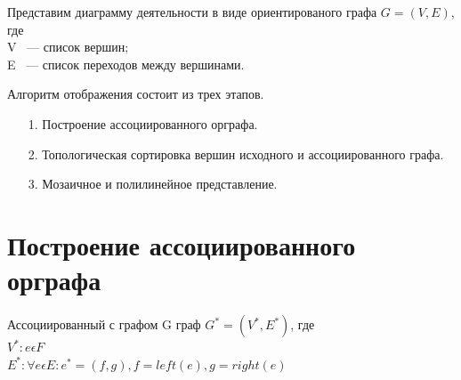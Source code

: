 \documentclass[12pt]{article}
\begin{document}
Представим диаграмму деятельности в виде ориентированого графа $ G = (V, E) $, где \\ V ~--- список вершин; \\ E ~--- список переходов между вершинами.

Алгоритм отображения состоит из трех этапов.
\begin{enumerate}
\item[1.] Построение ассоциированного орграфа.
\item[2.] Топологическая сортировка вершин исходного и ассоциированного графа.
\item[3.] Мозаичное и полилинейное представление.
\end{enumerate}

\section{Построение ассоциированного орграфа}

Ассоциированный с графом G граф $ G^{*} = (V^{*}, E^{*}) $, где \\
$ V^{*} : e \epsilon F $ \\
$ E^{*} : \forall e \epsilon E : e^{*} = (f, g), f = left(e), g = right(e) $
\end{document}
